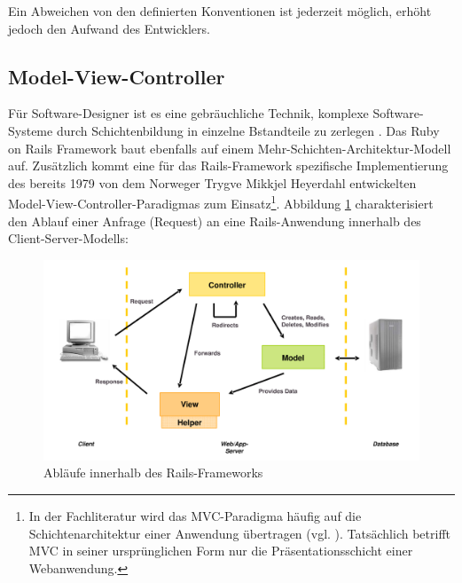 Ein Abweichen von den definierten Konventionen ist jederzeit möglich, erhöht jedoch den Aufwand des Entwicklers.

\subsection{Model-View-Controller}
\label{sec:mvc}
Für Software-Designer ist es  eine gebräuchliche Technik, komplexe Software-Systeme durch Schichtenbildung in einzelne Bstandteile zu zerlegen \citep[Kapitel 1]{FowlerPatterns}. Das Ruby on Rails Framework baut ebenfalls auf einem Mehr-Schichten-Architektur-Modell auf. Zusätzlich kommt eine für das Rails-Framework spezifische Implementierung des bereits 1979 von dem Norweger Trygve Mikkjel Heyerdahl entwickelten Model-View-Controller-Paradigmas zum Einsatz\footnote{In der Fachliteratur wird das MVC-Paradigma häufig auf die Schichtenarchitektur einer Anwendung übertragen (vgl. \cite[S. 544 ff.]{objekt}). Tatsächlich betrifft MVC in seiner  ursprünglichen Form nur die Präsentationsschicht einer Webanwendung.}.
Abbildung \ref{fig:mvcimage} charakterisiert den Ablauf einer Anfrage (Request) an eine Rails-Anwendung innerhalb des Client-Server-Modells:

\begin{figure}[!h]
\begin{center}
\includegraphics[scale=0.4]{images/analyse/mvc.png}
\caption{Abläufe innerhalb des Rails-Frameworks}
\label{fig:mvcimage}
\end{center}
\end{figure}

